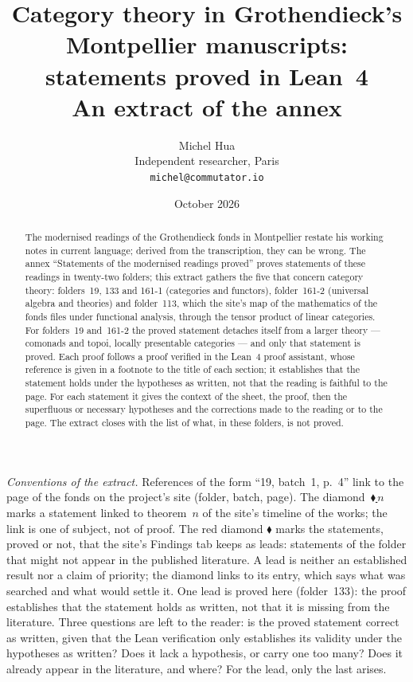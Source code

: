 \documentclass[11pt]{article}
\title{\Large Category theory in Grothendieck's Montpellier manuscripts:\\ statements proved in Lean~4\\[4pt] \normalsize An extract of the annex \q{Statements of the modernised readings proved}}
\author{Michel Hua\\ \small Independent researcher, Paris\\ \small \texttt{michel@commutator.io}}
\date{\small October 2026}
\newcommand{\q}[1]{“#1”}
\newcommand{\lie}[1]{\,\href{https://grothendieck.commutator.io/timeline/\#works}{\textcolor{frise}{\ensuremath{\blacklozenge}\,\textup{#1}}}}
\theoremstyle{plain}
\theoremstyle{definition}
\theoremstyle{remark}
\begin{document}
\maketitle

\begin{abstract}
\noindent The modernised readings of the Grothendieck fonds in Montpellier restate his working notes in current language; derived from the transcription, they can be wrong. The annex \q{Statements of the modernised readings proved} proves statements of these readings in twenty-two folders; this extract gathers the five that concern category theory: folders~19, 133 and 161-1 (categories and functors), folder~161-2 (universal algebra and theories) and folder~113, which the site's map of the mathematics of the fonds files under functional analysis, through the tensor product of linear categories. For folders~19 and~161-2 the proved statement detaches itself from a larger theory --- comonads and topoi, locally presentable categories --- and only that statement is proved. Each proof follows a proof verified in the Lean~4 proof assistant, whose reference is given in a footnote to the title of each section; it establishes that the statement holds under the hypotheses as written, not that the reading is faithful to the page. For each statement it gives the context of the sheet, the proof, then the superfluous or necessary hypotheses and the corrections made to the reading or to the page. The extract closes with the list of what, in these folders, is not proved.
\end{abstract}

\noindent\emph{Conventions of the extract.} References of the form \q{19, batch~1, p.~4} link to the page of the fonds on the project's site (folder, batch, page). The diamond \lie{$n$} marks a statement linked to theorem~$n$ of the site's timeline of the works; the link is one of subject, not of proof. The red diamond \textcolor{piste}{\ensuremath{\blacklozenge}} marks the statements, proved or not, that the site's Findings tab keeps as leads: statements of the folder that might not appear in the published literature. A lead is neither an established result nor a claim of priority; the diamond links to its entry, which says what was searched and what would settle it. One lead is proved here (folder~133): the proof establishes that the statement holds as written, not that it is missing from the literature. Three questions are left to the reader: is the proved statement correct as written, given that the Lean verification only establishes its validity under the hypotheses as written? Does it lack a hypothesis, or carry one too many? Does it already appear in the literature, and where? For the lead, only the last arises.
\end{document}
